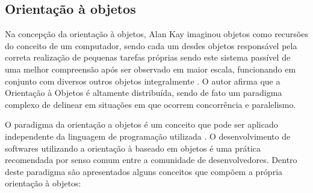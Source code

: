 \subsection{Orientação à objetos}

Na concepção da orientação à objetos, Alan Kay imaginou objetos como recursões do conceito de um computador, sendo cada um desdes objetos responsável pela correta realização de pequenas tarefas próprias sendo este sistema passível de uma melhor compreensão após ser observado em maior escala, funcionando em conjunto com diversos outros objetos integralmente \cite{reenskaug2009dci}. O autor afirma que a Orientação à Objetos é altamente distribuída, sendo de fato um paradigma complexo de delinear em situações em que ocorrem concorrência e paralelismo.

O paradigma da orientação a objetos é um conceito que pode ser aplicado independente da linguagem de programação utilizada \cite{rumbaugh1991object}. O desenvolvimento de softwares utilizando a orientação à baseado em objetos é uma prática recomendada por senso comum entre a comunidade de desenvolvedores. Dentro deste paradigma são apresentados alguns conceitos que compõem a própria orientação à objetos:

